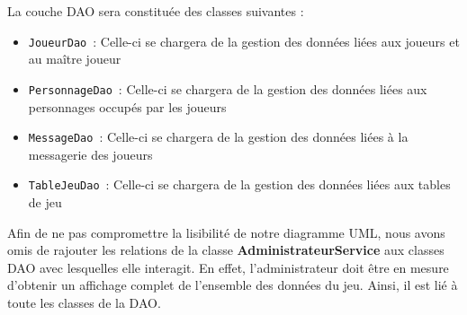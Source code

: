 \documentclass[11pt]{article}
\begin{document}
La couche DAO sera constituée des classes suivantes :

\begin{itemize}
    \item \texttt{JoueurDao}~: Celle-ci se chargera de la gestion des données liées aux joueurs et au maître joueur
    
    \item \texttt{PersonnageDao}~: Celle-ci se chargera de la gestion des données liées aux personnages occupés par les joueurs
    
    \item \texttt{MessageDao}~: Celle-ci se chargera de la gestion des données liées à la messagerie des joueurs
 
    \item \texttt{TableJeuDao}~: Celle-ci se chargera de la gestion des données liées aux tables de jeu

\end{itemize}

Afin de ne pas compromettre la lisibilité de notre diagramme UML, nous avons omis de rajouter les relations de la classe  \textbf{AdministrateurService} aux classes DAO avec lesquelles elle interagit. En effet, l'administrateur doit être en mesure d'obtenir un affichage complet de l'ensemble des données du jeu. Ainsi, il est lié à toute les classes de la DAO. 















\end{document}
